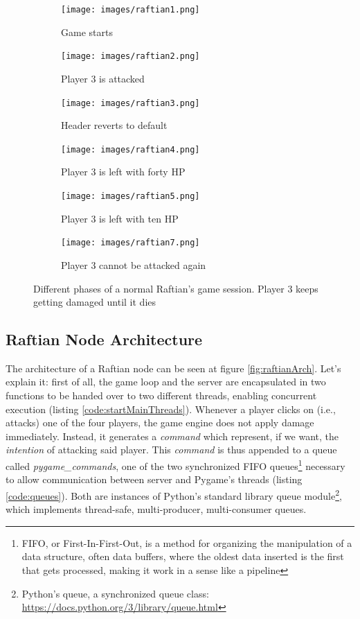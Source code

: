\begin{figure}[h]
    \centering
    \begin{subfigure}{0.31\textwidth}
        \texttt{[image: images/raftian1.png]}
        \caption{Game starts}
    \end{subfigure}
    \hfill
    \begin{subfigure}{0.31\textwidth}
        \texttt{[image: images/raftian2.png]}
        \caption{Player 3 is attacked}
    \end{subfigure}
    \hfill
    \begin{subfigure}{0.31\textwidth}
        \texttt{[image: images/raftian3.png]}
        \caption{Header reverts to default}
    \end{subfigure}
    \hfill
    \begin{subfigure}{0.31\textwidth}
        \texttt{[image: images/raftian4.png]}
        \caption{Player 3 is left with forty HP}
    \end{subfigure}
    \hfill
    \begin{subfigure}{0.31\textwidth}
        \texttt{[image: images/raftian5.png]}
        \caption{Player 3 is left with ten HP}
    \end{subfigure}
    \hfill
    \begin{subfigure}{0.31\textwidth}
        \texttt{[image: images/raftian7.png]}
        \caption{Player 3 cannot be attacked again}
    \end{subfigure}

    \caption{Different phases of a normal Raftian's game session. Player 3 keeps getting damaged until it dies}
    \label{fig:raftianUI}
\end{figure}

\subsection{Raftian Node Architecture}

The architecture of a Raftian node can be seen at figure \ref{fig:raftianArch}. Let's explain it: first of all, the game loop and the server are encapsulated in two functions to be handed over to two different threads, enabling concurrent execution (listing \ref{code:startMainThreads}). Whenever a player clicks on (i.e., attacks) one of the four players, the game engine does not apply damage immediately. Instead, it generates a \textit{command} which represent, if we want, the \textit{intention} of attacking said player. This \textit{command} is thus appended to a queue called \textit{pygame\_commands}, one of the two synchronized FIFO queues\footnote{FIFO, or First-In-First-Out, is a method for organizing the manipulation of a data structure, often data buffers, where the oldest data inserted is the first that gets processed, making it work in a sense like a pipeline} necessary to allow communication between server and Pygame's threads (listing \ref{code:queues}). Both are instances of Python's standard library queue module\footnote{Python's queue, a synchronized queue class: \url{https://docs.python.org/3/library/queue.html}}, which implements thread-safe, multi-producer, multi-consumer queues. 

